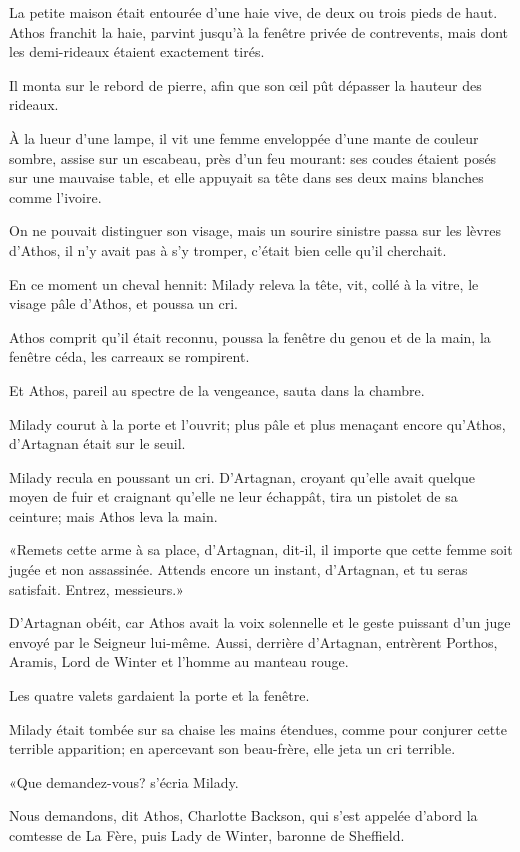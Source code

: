 La petite maison était entourée d'une haie vive, de deux ou trois pieds de haut. Athos franchit la haie, parvint jusqu'à la fenêtre privée de contrevents, mais dont les demi-rideaux étaient exactement tirés. 

Il monta sur le rebord de pierre, afin que son œil pût dépasser la hauteur des rideaux. 

À la lueur d'une lampe, il vit une femme enveloppée d'une mante de couleur sombre, assise sur un escabeau, près d'un feu mourant: ses coudes étaient posés sur une mauvaise table, et elle appuyait sa tête dans ses deux mains blanches comme l'ivoire. 

On ne pouvait distinguer son visage, mais un sourire sinistre passa sur les lèvres d'Athos, il n'y avait pas à s'y tromper, c'était bien celle qu'il cherchait. 

En ce moment un cheval hennit: Milady releva la tête, vit, collé à la vitre, le visage pâle d'Athos, et poussa un cri. 

Athos comprit qu'il était reconnu, poussa la fenêtre du genou et de la main, la fenêtre céda, les carreaux se rompirent. 

Et Athos, pareil au spectre de la vengeance, sauta dans la chambre. 

Milady courut à la porte et l'ouvrit; plus pâle et plus menaçant encore qu'Athos, d'Artagnan était sur le seuil. 

Milady recula en poussant un cri. D'Artagnan, croyant qu'elle avait quelque moyen de fuir et craignant qu'elle ne leur échappât, tira un pistolet de sa ceinture; mais Athos leva la main. 

«Remets cette arme à sa place, d'Artagnan, dit-il, il importe que cette femme soit jugée et non assassinée. Attends encore un instant, d'Artagnan, et tu seras satisfait. Entrez, messieurs.» 

D'Artagnan obéit, car Athos avait la voix solennelle et le geste puissant d'un juge envoyé par le Seigneur lui-même. Aussi, derrière d'Artagnan, entrèrent Porthos, Aramis, Lord de Winter et l'homme au manteau rouge. 

Les quatre valets gardaient la porte et la fenêtre. 

Milady était tombée sur sa chaise les mains étendues, comme pour conjurer cette terrible apparition; en apercevant son beau-frère, elle jeta un cri terrible. 

«Que demandez-vous? s'écria Milady. 

\speak  Nous demandons, dit Athos, Charlotte Backson, qui s'est appelée d'abord la comtesse de La Fère, puis Lady de Winter, baronne de Sheffield. 

